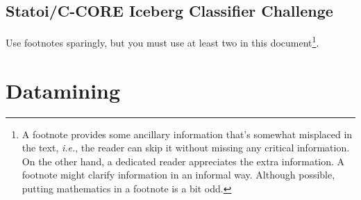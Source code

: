 \documentclass[fleqn,10pt]{SelfArx} %
\begin{document}
\subsection{Statoi/C-CORE Iceberg Classifier Challenge}

  Use footnotes sparingly, but you must use at least two in this document\footnote{A footnote provides some ancillary information that's somewhat misplaced in the text, \textit{i.e.}, the reader can skip it without missing any critical information.  On the other hand, a dedicated reader appreciates the extra information.  A footnote might clarify information in an informal way.  Although possible, putting mathematics in a footnote is a bit odd.}.


\section{Datamining}
\end{document}
